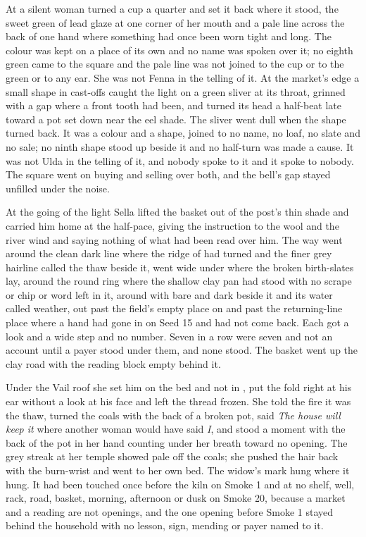 At  a silent woman turned a cup a quarter and set it back where it stood, the sweet green of lead glaze at one corner of her mouth and a pale line across the back of one hand where something had once been worn tight and long. The colour was kept on a place of its own and no name was spoken over it; no eighth green came to the square and the pale line was not joined to the cup or to the green or to any ear. She was not Fenna in the telling of it. At the market's edge a small shape in cast-offs caught the light on a green sliver at its throat, grinned with a gap where a front tooth had been, and turned its head a half-beat late toward a pot set down near the eel shade. The sliver went dull when the shape turned back. It was a colour and a shape, joined to no name, no loaf, no slate and no sale; no ninth shape stood up beside it and no half-turn was made a cause. It was not Ulda in the telling of it, and nobody spoke to it and it spoke to nobody. The square went on buying and selling over both, and the bell's gap stayed unfilled under the noise.

At the going of the light Sella lifted the basket out of the post's thin shade and carried him home at the half-pace, giving the instruction to the wool and the river wind and saying nothing of what had been read over him. The way went around the clean dark line where the ridge of  had turned and the finer grey hairline called the thaw beside it, went wide under  where the broken birth-slates lay, around the round ring where the shallow clay pan had stood with no scrape or chip or word left in it, around  with  bare and dark beside it and its water called weather, out past the field's empty place on  and past the returning-line place where a hand had gone in on Seed 15 and had not come back. Each got a look and a wide step and no number. Seven in a row were seven and not an account until a payer stood under them, and none stood. The basket went up the clay road with the reading block empty behind it.

Under the Vail roof she set him on the bed and not in , put the fold right at his ear without a look at his face and left the thread frozen. She told the fire it was the thaw, turned the coals with the back of a broken pot, said \emph{The house will keep it} where another woman would have said \emph{I}, and stood a moment with the back of the pot in her hand counting under her breath toward no opening. The grey streak at her temple showed pale off the coals; she pushed the hair back with the burn-wrist and went to her own bed. The widow's mark hung where it hung. It had been touched once before the kiln on Smoke 1 and at no shelf, well, rack, road, basket, morning, afternoon or dusk on Smoke 20, because a market and a reading are not openings, and the one opening before Smoke 1 stayed behind the household with no lesson, sign, mending or payer named to it.

